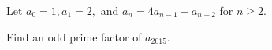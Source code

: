 Let $a_0=1,a_1=2,$ and $a_n=4a_{n-1}-a_{n-2}$ for $n\ge 2.$

Find an odd prime factor of $a_{2015}.$